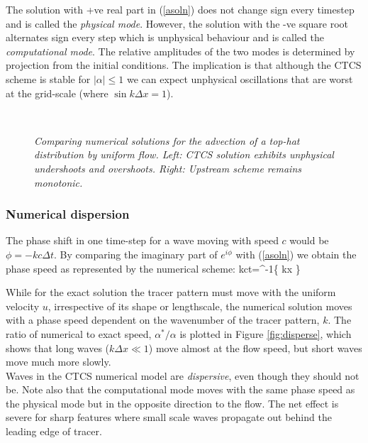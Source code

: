 The solution with +ve real part in (\ref{asoln}) does not change sign
every timestep and is called the {\em physical mode}. However, the
solution with the -ve square root alternates sign every step which is
unphysical behaviour and is called the {\em computational mode}. The
relative amplitudes of the two modes is determined by projection from
the initial conditions. The implication is that although the CTCS
scheme is stable for $|\alpha | \le 1$ we can expect unphysical
oscillations that are worst at the grid-scale (where $\sin k\Delta
x=1$).

\begin{figure}
	\mbox{
		}
	\caption{\textsl{Comparing numerical solutions for the advection of a top-hat distribution by uniform flow. Left: CTCS solution exhibits unphysical undershoots and overshoots. Right: Upstream scheme remains monotonic.}}
	\label{fig:ctcs}
\end{figure}


\subsubsection{Numerical dispersion}

The phase shift in one time-step for a wave moving with speed $c$
would be $\phi=-kc\Delta t$. By comparing the imaginary part of
$e^{i\phi}$ with (\ref{asoln}) we obtain the phase speed as
represented by the numerical scheme: 
\BEQ kc\Delta t=\sin^{-1}\left\{
\alpha \sin k\Delta x \right\} \EEQ

While for the exact solution the tracer pattern must move with the
uniform velocity $u$, irrespective of its shape or lengthscale, the
numerical solution moves with a phase speed dependent on the
wavenumber of the tracer pattern, $k$. The ratio of numerical to exact speed, $\alpha^*/\alpha$ is plotted in Figure \ref{fig:disperse}, which shows that long waves ($k\Delta x \ll 1$) move almost at the flow speed, but short waves move much more slowly.\\
Waves in the CTCS numerical model are {\em
	dispersive}, even though they should not be. Note also that the
computational mode moves with the same phase speed as the physical
mode but in the opposite direction to the flow. The net effect is
severe for sharp features where small scale waves propagate out behind
the leading edge of tracer.

